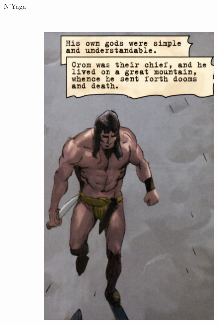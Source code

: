 \begin{frame}{N'Yaga}
\begin{columns}
\begin{figure}[htp]
\begin{subfigure}[b]{0.27\textwidth}
				\includegraphics[width=\textwidth]{img/conan/DH}
			\end{subfigure}
			~
			\begin{subfigure}[b]{0.23\textwidth}

\end{subfigure}
\end{figure}
\end{columns}
\end{frame}
